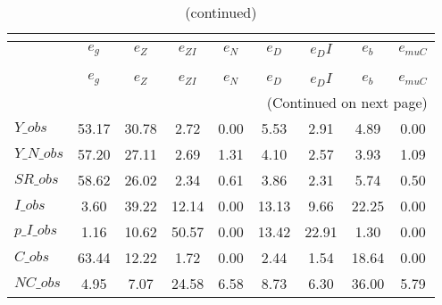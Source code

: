  
\begin{center}
\begin{longtable}{lcccccccc} 
\caption{VARIANCE DECOMPOSITION (in percent)}\\
 \label{Table:th_var_decomp_uncond}\\
\toprule 
$               $	 & 	 $        {e_g}$	 & 	 $        {e_Z}$	 & 	 $     {e_{ZI}}$	 & 	 $        {e_N}$	 & 	 $        {e_D}$	 & 	 $       {e_DI}$	 & 	 $        {e_b}$	 & 	 $    {e_{muC}}$\\
\midrule \endfirsthead 
\caption{(continued)}\\
 \toprule \\ 
$               $	 & 	 $        {e_g}$	 & 	 $        {e_Z}$	 & 	 $     {e_{ZI}}$	 & 	 $        {e_N}$	 & 	 $        {e_D}$	 & 	 $       {e_DI}$	 & 	 $        {e_b}$	 & 	 $    {e_{muC}}$\\
\midrule \endhead 
\midrule \multicolumn{9}{r}{(Continued on next page)} \\ \bottomrule \endfoot 
\bottomrule \endlastfoot 
$Y\_obs         $	 & 	        53.17	 & 	        30.78	 & 	         2.72	 & 	         0.00	 & 	         5.53	 & 	         2.91	 & 	         4.89	 & 	         0.00 \\ 
$Y\_N\_obs      $	 & 	        57.20	 & 	        27.11	 & 	         2.69	 & 	         1.31	 & 	         4.10	 & 	         2.57	 & 	         3.93	 & 	         1.09 \\ 
$SR\_obs        $	 & 	        58.62	 & 	        26.02	 & 	         2.34	 & 	         0.61	 & 	         3.86	 & 	         2.31	 & 	         5.74	 & 	         0.50 \\ 
$I\_obs         $	 & 	         3.60	 & 	        39.22	 & 	        12.14	 & 	         0.00	 & 	        13.13	 & 	         9.66	 & 	        22.25	 & 	         0.00 \\ 
$p\_I\_obs      $	 & 	         1.16	 & 	        10.62	 & 	        50.57	 & 	         0.00	 & 	        13.42	 & 	        22.91	 & 	         1.30	 & 	         0.00 \\ 
$C\_obs         $	 & 	        63.44	 & 	        12.22	 & 	         1.72	 & 	         0.00	 & 	         2.44	 & 	         1.54	 & 	        18.64	 & 	         0.00 \\ 
$NC\_obs        $	 & 	         4.95	 & 	         7.07	 & 	        24.58	 & 	         6.58	 & 	         8.73	 & 	         6.30	 & 	        36.00	 & 	         5.79 \\ 

\end{longtable}
\end{center}

